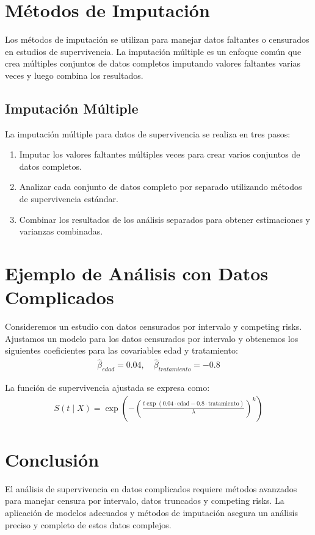 \documentclass[a4paper]{report} %
\begin{document}
\section{M\'etodos de Imputaci\'on}
Los m\'etodos de imputaci\'on se utilizan para manejar datos faltantes o censurados en estudios de supervivencia. La imputaci\'on m\'ultiple es un enfoque com\'un que crea m\'ultiples conjuntos de datos completos imputando valores faltantes varias veces y luego combina los resultados.

\subsection{Imputaci\'on M\'ultiple}
La imputaci\'on m\'ultiple para datos de supervivencia se realiza en tres pasos:
\begin{enumerate}
    \item Imputar los valores faltantes m\'ultiples veces para crear varios conjuntos de datos completos.
    \item Analizar cada conjunto de datos completo por separado utilizando m\'etodos de supervivencia est\'andar.
    \item Combinar los resultados de los an\'alisis separados para obtener estimaciones y varianzas combinadas.
\end{enumerate}

\section{Ejemplo de An\'alisis con Datos Complicados}
Consideremos un estudio con datos censurados por intervalo y competing risks. Ajustamos un modelo para los datos censurados por intervalo y obtenemos los siguientes coeficientes para las covariables edad y tratamiento:
\begin{eqnarray*}
\hat{\beta}_{edad} = 0.04, \quad \hat{\beta}_{tratamiento} = -0.8
\end{eqnarray*}

La funci\'on de supervivencia ajustada se expresa como:
\begin{eqnarray*}
S(t \mid X) = \exp\left(-\left(\frac{t \exp(0.04 \cdot \text{edad} - 0.8 \cdot \text{tratamiento})}{\lambda}\right)^k\right)
\end{eqnarray*}

\section{Conclusi\'on}
El an\'alisis de supervivencia en datos complicados requiere m\'etodos avanzados para manejar censura por intervalo, datos truncados y competing risks. La aplicaci\'on de modelos adecuados y m\'etodos de imputaci\'on asegura un an\'alisis preciso y completo de estos datos complejos.
\end{document}
